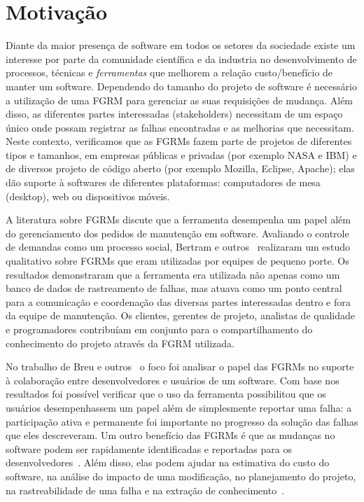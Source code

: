 \section{Motivação}
\label{sec:intro-motivacao}

Diante da maior presença de software em todos os setores da sociedade existe um
interesse por parte da comunidade científica e da industria no desenvolvimento
de processos, técnicas e \textit{ferramentas} que melhorem a relação
custo/benefício de manter um software. Dependendo do tamanho do projeto de
software é necessário a utilização de uma FGRM para gerenciar as suas
requisições de mudança. Além disso, as diferentes partes interessadas
(stakeholders) necessitam de um espaço único onde possam registrar as falhas
encontradas e as melhorias que necessitam. Neste contexto, verificamos que as
FGRMs fazem parte de projetos de diferentes tipos e tamanhos, em empresas
públicas e privadas (por exemplo NASA e IBM) e de diversos projeto de código
aberto (por exemplo Mozilla, Eclipse, Apache); elas dão suporte à softwares de
diferentes plataformas: computadores de mesa (desktop), web ou dispositivos
móveis.


A literatura sobre FGRMs discute que a ferramenta desempenha um papel além do
gerenciamento dos pedidos de manutenção em software. Avaliando o controle de
demandas como um processo social, Bertram e
outros~\cite{Bertram:2010:CCB:1718918.1718972} realizaram um estudo qualitativo
sobre FGRMs que eram utilizadas por equipes de pequeno porte. Os resultados
demonstraram que a ferramenta era utilizada não apenas como um banco de dados de
rastreamento de falhas, mas atuava como um ponto central para a comunicação e
coordenação das diversas partes interessadas dentro e fora da equipe de
manutenção. Os clientes, gerentes de projeto, analistas de qualidade e
programadores contribuíam em conjunto para o compartilhamento do conhecimento do
projeto através da FGRM utilizada.

No trabalho de Breu e outros~\cite{Breu:2010:INB:1718918.1718973} o foco foi
analisar o papel das FGRMs no suporte à colaboração entre desenvolvedores e
usuários de um software. Com base nos resultados foi possível verificar que o
uso da ferramenta possibilitou que os usuários desempenhassem um papel além de
simplesmente reportar uma falha: a participação ativa e permanente foi
importante no progresso da solução das falhas que eles descreveram. Um outro
benefício das FGRMs é que as mudanças no software podem ser rapidamente
identificadas e reportadas para os desenvolvedores~\cite{anvik2005coping}. Além
disso, elas podem ajudar na estimativa do custo do software, na análise do
impacto de uma modificação, no planejamento do projeto, na rastreabilidade de
uma falha e na extração de conhecimento~\cite{cavalcanti2013bug}.

